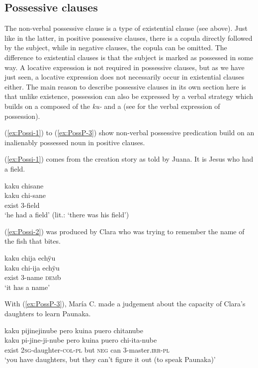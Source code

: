 \subsection{Possessive clauses}\label{sec:PossessiveClauses}

The non-verbal possessive clause is a type of existential clause (see  above). Just like in the latter, in positive possessive clauses, there is a copula directly followed by the subject, while in negative clauses, the copula can be omitted. The difference to existential clauses is that the subject is marked as possessed in some way. A locative expression is not required in possessive clauses, but as we have just seen, a locative expression does not necessarily occur in existential clauses either. The main reason to describe possessive clauses in its own section here is that unlike existence, possession can also be expressed by a verbal strategy which builds on a  composed of the  \textit{ku-} and a  (see  for the verbal expression of possession).

(\ref{ex:Possi-1}) to (\ref{ex:PossP-3}) show non-verbal possessive predication build on an inalienably possessed noun in positive clauses.

(\ref{ex:Possi-1}) comes from the creation story as told by Juana. It is Jesus who had a field.

\ea\label{ex:Possi-1}
\begingl
\glpreamble kaku chisane\\
\gla kaku chi-sane\\
\glb exist 3-field\\
\glft ‘he had a field’ (lit.: ‘there was his field’)
\endgl
\trailingcitation{[jxx-n101013s-1.555]}
\xe

(\ref{ex:Possi-2}) was produced by Clara who was trying to remember the name of the fish that bites.

\ea\label{ex:Possi-2}
\begingl
\glpreamble kaku chija echÿu\\
\gla kaku chi-ija echÿu\\
\glb exist 3-name \textsc{dem}b\\
\glft ‘it has a name’
\endgl
\trailingcitation{[cux-c120414ls-1.217]}
\xe

With (\ref{ex:PossP-3}), María C. made a judgement about the capacity of Clara’s daughters to learn Paunaka.

\newpage
\ea\label{ex:PossP-3}
\begingl 
\glpreamble kaku pijinejinube pero kuina puero chitanube\\
\gla kaku pi-jine-ji-nube pero kuina puero chi-ita-nube\\ 
\glb exist 2\textsc{sg}-daughter-\textsc{col}-\textsc{pl} but \textsc{neg} can 3-master.\textsc{irr}-\textsc{pl}\\ 
\glft ‘you have daughters, but they can't figure it out (to speak Paunaka)’
\trailingcitation{[cux-c120414ls-2.265]}
\xe


